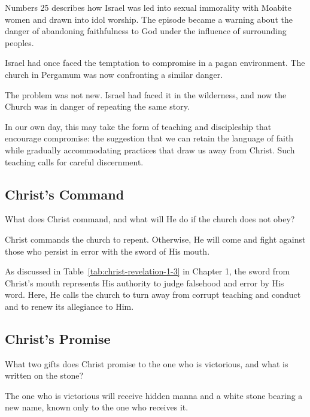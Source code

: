 Numbers 25 describes how Israel was led into sexual immorality with Moabite women and drawn into idol worship. The episode became a warning about the danger of abandoning faithfulness to God under the influence of surrounding peoples.

Israel had once faced the temptation to compromise in a pagan environment. The church in Pergamum was now confronting a similar danger.

The problem was not new. Israel had faced it in the wilderness, and now the Church was in danger of repeating the same story.

In our own day, this may take the form of teaching and discipleship that encourage compromise: the suggestion that we can retain the language of faith while gradually accommodating practices that draw us away from Christ. Such teaching calls for careful discernment.

\subsection{Christ's Command}

\begin{ScriptureBox2}{What does Christ command, and what will He do if the church does not obey?}
\item[2:16] Christ commands the church to repent. Otherwise, He will come and fight against those who persist in error with the sword of His mouth.
\end{ScriptureBox2}

As discussed in Table~\ref{tab:christ-revelation-1-3} in Chapter 1, the sword from Christ's mouth represents His authority to judge falsehood and error by His word. Here, He calls the church to turn away from corrupt teaching and conduct and to renew its allegiance to Him.

\subsection{Christ's Promise}

\begin{ScriptureBox2}{What two gifts does Christ promise to the one who is victorious, and what is written on the stone?}
\item[2:17] The one who is victorious will receive hidden manna and a white stone bearing a new name, known only to the one who receives it.
\end{ScriptureBox2}

